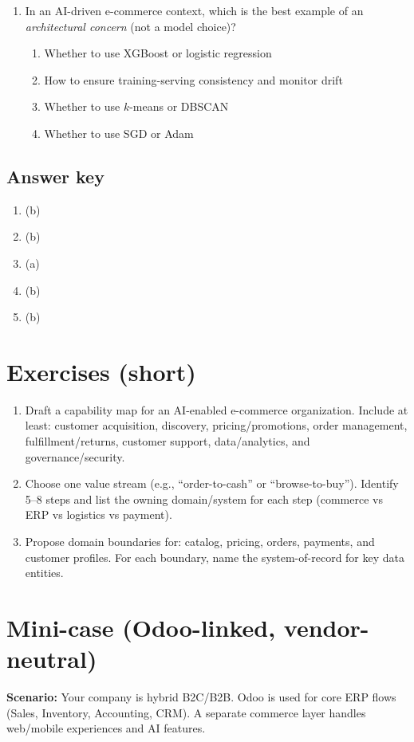 \begin{enumerate}
  \item In an AI-driven e-commerce context, which is the best example of an \emph{architectural concern} (not a model choice)?
  \begin{enumerate}
    \item Whether to use XGBoost or logistic regression
    \item How to ensure training-serving consistency and monitor drift
    \item Whether to use $k$-means or DBSCAN
    \item Whether to use SGD or Adam
  \end{enumerate}
\end{enumerate}

\subsection*{Answer key}
\begin{enumerate}
  \item (b)
  \item (b)
  \item (a)
  \item (b)
  \item (b)
\end{enumerate}

\section{Exercises (short)}
\begin{enumerate}
  \item Draft a capability map for an AI-enabled e-commerce organization. Include at least: customer acquisition, discovery, pricing/promotions, order management, fulfillment/returns, customer support, data/analytics, and governance/security.
  \item Choose one value stream (e.g., ``order-to-cash'' or ``browse-to-buy''). Identify 5--8 steps and list the owning domain/system for each step (commerce vs ERP vs logistics vs payment).
  \item Propose domain boundaries for: catalog, pricing, orders, payments, and customer profiles. For each boundary, name the system-of-record for key data entities.
\end{enumerate}

\section{Mini-case (Odoo-linked, vendor-neutral)}
\textbf{Scenario:} Your company is hybrid B2C/B2B. Odoo is used for core ERP flows (Sales, Inventory, Accounting, CRM). A separate commerce layer handles web/mobile experiences and AI features.

